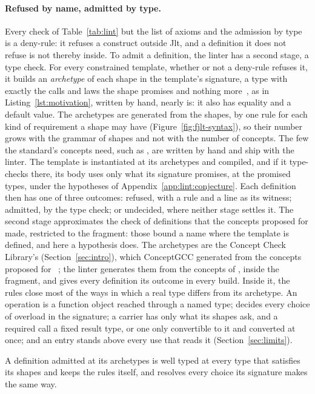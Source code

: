 \paragraph{Refused by name, admitted by type.}
Every check of Table~\ref{tab:lint} but the list of axioms and the admission by type is a deny-rule: it refuses a construct outside Jlt, and a definition it does not refuse is not thereby inside.
To admit a definition, the linter has a second stage, a type check.
For every constrained template, whether or not a deny-rule refuses it, it builds an \emph{archetype} of each shape in the template's signature, a type with exactly the calls and laws the shape promises and nothing more~\cite{siek2000concept}, as  in Listing~\ref{lst:motivation}, written by hand, nearly is: it also has equality and a default value.
The archetypes are generated from the shapes, by one rule for each kind of requirement a shape may have (Figure~\ref{fig:fjlt-syntax}), so their number grows with the grammar of shapes and not with the number of concepts.
The few the standard's concepts need, such as , are written by hand and ship with the linter.
The template is instantiated at its archetypes and compiled, and if it type-checks there, its body uses only what its signature promises, at the promised types, under the hypotheses of Appendix~\ref{app:lint:conjecture}.
Each definition then has one of three outcomes: refused, with a rule and a line as its witness; admitted, by the type check; or undecided, where neither stage settles it.
The second stage approximates the check of definitions that the concepts proposed for  made, restricted to the fragment: those bound a name where the template is defined, and here a hypothesis does.
The archetypes are the Concept Check Library's (Section~\ref{sec:intro}), which ConceptGCC generated from the concepts proposed for ~\cite{gregor2006concepts}; the linter generates them from the concepts of , inside the fragment, and gives every definition its outcome in every build.
Inside it, the rules close most of the ways in which a real type differs from its archetype.
An operation is a function object reached through a named type; \RuleTwo{} decides every choice of overload in the signature; a carrier has only what its shapes ask, and a required call a fixed result type, or one only convertible to it and converted at once; and an entry stands above every use that reads it (Section~\ref{sec:limits}).

\begin{conjecture}[Archetypes]
\label{conj:archetypes}
A definition admitted at its archetypes is well typed at every type that satisfies its shapes and keeps the rules itself, and resolves every choice its signature makes the same way.
\end{conjecture}

